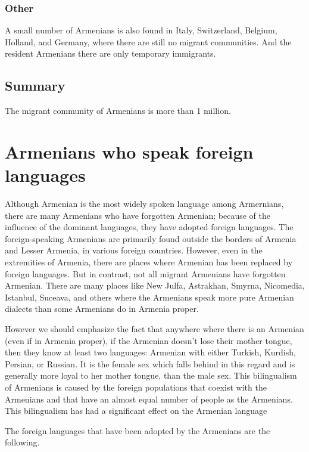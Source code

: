 \subsection{Other}

A small number of Armenians is also found in Italy, Switzerland, Belgium, Holland, and Germany, where there are still no migrant communities. And the resident Armenians there are only temporary immigrants.

\section{Summary}
The migrant community of Armenians is more than 1 million.

\chapter{Armenians who speak foreign languages}\label{chapter:NonSpeaking}

Although Armenian is the most widely spoken language among Armernians, there are many Armenians who have forgotten Armenian; because of the influence of the dominant languages, they have adopted foreign languages. The foreign-speaking Armenians are primarily found outside the borders of Armenia and Lesser Armenia, in various foreign countries. However, even in the extremities of Armenia, there are places where Armenian has been replaced by foreign languages. But in contrast, not all migrant Armenians have forgotten Armenian. There are many places like New Julfa, Astrakhan, Smyrna, Nicomedia, Istanbul, Suceava, and others where the Armenians speak more pure Armenian dialects than some Armenians do in Armenia proper. 

However we should emphasize the fact that anywhere where there is an Armenian (even if in Armenia proper), if the Armenian doesn't lose their mother tongue, then they know at least two languages: Armenian with either Turkish, Kurdish, Persian, or Russian. It is the female sex which falls behind in this regard and is generally more loyal to her mother tongue, than the male sex. This bilingualism of Armenians is caused by the foreign populations that coexist with the Armenians and that have an almost equal number of people as the Armenians. This bilingualism has had a significant effect on the Armenian language

The foreign languages that have been adopted by the Armenians are the following. 


